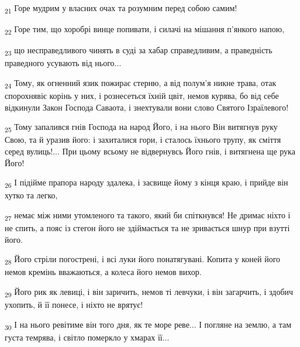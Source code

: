 \begin{tcolorbox}
\textsubscript{21} Горе мудрим у власних очах та розумним перед собою самим!
\end{tcolorbox}
\begin{tcolorbox}
\textsubscript{22} Горе тим, що хоробрі винце попивати, і силачі на мішання п'янкого напою,
\end{tcolorbox}
\begin{tcolorbox}
\textsubscript{23} що несправедливого чинять в суді за хабар справедливим, а праведність праведного усувають від нього...
\end{tcolorbox}
\begin{tcolorbox}
\textsubscript{24} Тому, як огненний язик пожирає стерню, а від полум'я никне трава, отак спорохнявіє корінь у них, і рознесеться їхній цвіт, немов курява, бо від себе відкинули Закон Господа Саваота, і знехтували вони слово Святого Ізраїлевого!
\end{tcolorbox}
\begin{tcolorbox}
\textsubscript{25} Тому запалився гнів Господа на народ Його, і на нього Він витягнув руку Свою, та й уразив його: і захиталися гори, і сталось їхнього трупу, як сміття серед вулиць!... При цьому всьому не відвернувсь Його гнів, і витягнена ще рука Його!
\end{tcolorbox}
\begin{tcolorbox}
\textsubscript{26} І підійме прапора народу здалека, і засвище йому з кінця краю, і прийде він хутко та легко,
\end{tcolorbox}
\begin{tcolorbox}
\textsubscript{27} немає між ними утомленого та такого, який би спіткнувся! Не дримає ніхто і не спить, а пояс із стегон його не здіймається та не зривається шнур при взутті його.
\end{tcolorbox}
\begin{tcolorbox}
\textsubscript{28} Його стріли погострені, і всі луки його понатягувані. Копита у коней його немов кремінь вважаються, а колеса його немов вихор.
\end{tcolorbox}
\begin{tcolorbox}
\textsubscript{29} Його рик як левиці, і він заричить, немов ті левчуки, і він загарчить, і здобич ухопить, й її понесе, і ніхто не врятує!
\end{tcolorbox}
\begin{tcolorbox}
\textsubscript{30} І на нього ревітиме він того дня, як те море реве... І погляне на землю, а там густа темрява, і світло померкло у хмарах її...
\end{tcolorbox}

